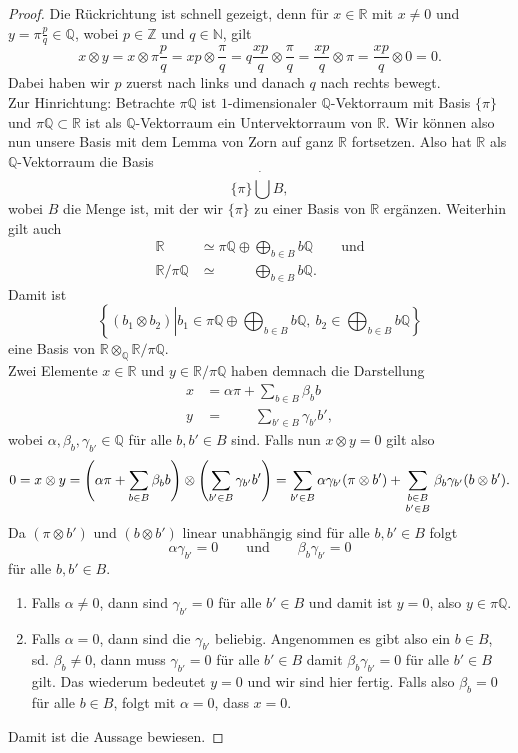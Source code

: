 \documentclass[11pt,titlepage]{article}
\newcommand{\setN}{\mathbb{N}}
\newcommand{\setZ}{\mathbb{Z}}
\newcommand{\setQ}{\mathbb{Q}}
\newcommand{\setR}{\mathbb{R}}
\theoremstyle{definition}
\theoremstyle{remark}
\begin{document}
	\begin{proof}
		Die Rückrichtung ist schnell gezeigt, 
		denn für $x\in\setR$ mit $x\neq 0$ und $y=\pi\frac{p}{q}\in\setQ$, wobei $p\in\setZ$ und $q\in\setN$, gilt
		\[ x\otimes y =x\otimes\pi \frac{p}{q} =xp\otimes\frac{\pi}{q} =q\frac{xp}{q}
		\otimes\frac{\pi}{q} = \frac{xp}{q}\otimes\pi =\frac{xp}{q}\otimes 0=0.\]
		Dabei haben wir $p$ zuerst nach links und danach $q$ nach rechts bewegt. \\
		Zur Hinrichtung: Betrachte $\pi\setQ$ ist $1$-dimensionaler 
		$\setQ$-Vektorraum mit Basis $\{\pi\}$ und $\pi\setQ\subset\setR$ ist 
		als $\setQ$-Vektorraum ein 
		Untervektorraum von $\setR$. Wir können also nun 
		unsere Basis mit dem Lemma von Zorn auf ganz $\setR$ fortsetzen. 
		Also hat $\setR$ als $\setQ$-Vektorraum die Basis
		\[\{\pi\}\dot\bigcup B,\]
		wobei $B$ die Menge ist, mit der wir $\{\pi\}$ zu einer Basis von $\setR$ 
		ergänzen. Weiterhin gilt auch
		\begin{align*}
			\setR&\simeq\pi\setQ\oplus\bigoplus_{b\in B}b\setQ\qquad\text{und}\\
			\setR /\pi\setQ&\simeq\qquad\ \ \bigoplus_{b\in B}b\setQ.
		\end{align*}
		Damit ist
		\[\left\{(b_1\otimes b_2)\left\vert b_1\in\pi\setQ\oplus\bigoplus_{b\in B}b\setQ,\ b_2\in \bigoplus_{b\in B}b\setQ\right\}\right.\]
		eine Basis von $\setR\otimes_\setQ\setR/\pi\setQ$. \\
		Zwei Elemente $x\in\setR$ und $y\in\setR/\pi\setQ$ haben demnach die 
		Darstellung
		\begin{align*}
			x&=\alpha\pi+\sum_{b\in B}\beta_b b \\
			y&= \qquad\ \sum_{b'\in B}\gamma_{b'}b',
		\end{align*}
		wobei $\alpha,\beta_b,\gamma_{b'}\in\setQ$ für alle $b,b'\in B$ sind. 
		Falls nun $x\otimes y=0$ gilt also
		\[0=x\otimes y=\left(\alpha\pi+\sum_{b\in B}\beta_b b\right)\otimes
		\left(\sum_{b'\in B}\gamma_{b'}b'\right)=\sum_{b'\in 
		B}\alpha\gamma_{b'}(\pi\otimes b')+\sum_{\genfrac{}{}{0pt}{1}{b\in B}
		{b'\in B}} \beta_b\gamma_{b'}(b\otimes b').\]
		Da $(\pi\otimes b')$ und $(b\otimes b')$ linear unabhängig sind für alle  
		$b,b'\in B$ folgt
		\[\alpha\gamma_{b'}=0\qquad\text{und}\qquad \beta_b\gamma_{b'}=0\]
		für alle $b,b'\in B$. 
		\begin{enumerate}
			\item Falls $\alpha\neq 0$, dann sind $\gamma_{b'}=0$ für alle 
			$b'\in B$ und damit ist $y=0$, also $y\in \pi\setQ$.
			\item Falls $\alpha=0$, dann sind die $\gamma_{b'}$ beliebig. 
			Angenommen es gibt also ein $b\in B$, sd. $\beta_b \neq 0$, dann 
			muss $\gamma_{b'}=0$ für alle $b'\in B$ damit $\beta_b\gamma_{b'}=0$ 
			für alle $b'\in B$ gilt. Das wiederum bedeutet $y=0$ und wir sind hier 
			fertig. Falls also $\beta_b=0$ für alle $b\in B$, folgt mit $\alpha=0$, 
			dass $x=0$.
		\end{enumerate}
		Damit ist die Aussage bewiesen.
	\end{proof}
\end{document}
